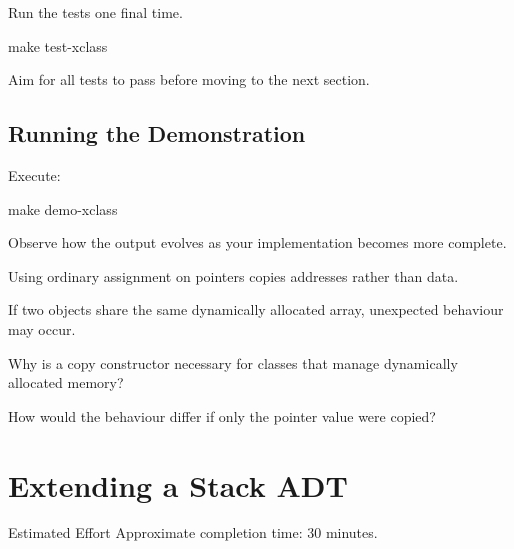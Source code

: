 \documentclass{csc2059practical}
\begin{document}
Run the tests one final time.

\begin{terminal}
make test-xclass
\end{terminal}

Aim for all tests to pass before moving to the next section.

\subsection*{Running the Demonstration}

Execute:

\begin{terminal}
make demo-xclass
\end{terminal}

Observe how the output evolves as your implementation becomes more
complete.

\begin{commonerror}

Using ordinary assignment on pointers copies addresses rather than
data.

If two objects share the same dynamically allocated array, unexpected
behaviour may occur.

\end{commonerror}

\begin{reflectionbox}

Why is a copy constructor necessary for classes that manage dynamically
allocated memory?

How would the behaviour differ if only the pointer value were copied?

\end{reflectionbox}

\section{Extending a Stack ADT}

\begin{infobox}{Estimated Effort}
Approximate completion time: 30 minutes.
\end{infobox}
\end{document}
